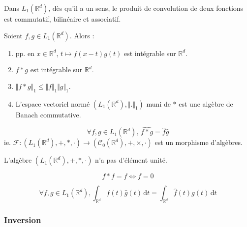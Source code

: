   \begin{proposition}
    Dans $L_1(\mathbb{R}^d)$, dès qu'il a un sens, le produit de convolution de deux fonctions est commutatif, bilinéaire et associatif.
  \end{proposition}

  \begin{theorem}
    Soient $f, g \in L_1(\mathbb{R}^d)$. Alors :
    \begin{enumerate}[label=(\roman*)]
      \item pp. en $x \in \mathbb{R}^d$, $t \mapsto f(x-t)g(t)$ est intégrable sur $\mathbb{R}^d$.
      \item $f * g$ est intégrable sur $\mathbb{R}^d$.
      \item $\Vert f * g \Vert_1 \leq \Vert f \Vert_1 \Vert g \Vert_1$.
      \item L'espace vectoriel normé $(L_1(\mathbb{R}^d), \Vert . \Vert_1)$ muni de $*$ est une algèbre de Banach commutative.
    \end{enumerate}
  \end{theorem}


  \begin{proposition}
    \[ \forall f, g \in L_1(\mathbb{R}^d), \, \widehat{f * g} = \widehat{f} \widehat{g} \]
    ie. $\mathcal{F} : (L_1(\mathbb{R}^d), +, *, \cdot) \rightarrow (\mathcal{C}_0(\mathbb{R}^d), +, \times, \cdot)$ est un morphisme d'algèbres.
  \end{proposition}

  \begin{corollary}
    L'algèbre $(L_1(\mathbb{R}^d), +, *, \cdot)$ n'a pas d'élément unité.
  \end{corollary}

  \begin{application}
    \[ f * f = f \iff f = 0 \]
  \end{application}

  \begin{theorem}
    \[ \forall f, g \in L_1(\mathbb{R}^d), \int_{\mathbb{R}^d} f(t) \widehat{g}(t) \, \mathrm{d}t = \int_{\mathbb{R}^d} \widehat{f}(t) g(t) \, \mathrm{d}t \]
  \end{theorem}

  \subsubsection{Inversion}

